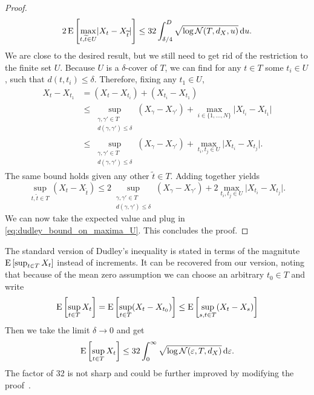 \begin{proof}
\begin{equation}\label{eq:dudley_bound_on_maxima_U}
    2 \E\left[\max_{t,\widetilde{t} \in U} \lvert X_{t} - X_{\widetilde{t}} \rvert\right] \leq 32 \int_{\delta/4}^{D}  \sqrt{\log \mathcal{N}(T,d_{X},u)} \dx[u].
\end{equation}
We are close to the desired result, but we still need to get rid of the restriction to the finite set $U$.
Because $U$ is a $\delta$-cover of $T$, we can find for any \( t \in T \) some $t_{i} \in U$, such that \( d(t,t_{i})  \leq \delta \). Therefore, fixing any $t_{1} \in U$,
\begin{align*}
    X_{t}-X_{t_{1}} &= (X_{t}-X_{t_{i}}) + (X_{t_{i}}-X_{t_{1}})\\
    &\leq \sup_{\substack{\gamma,\gamma' \in T \\ d(\gamma,\gamma')\leq \delta}} (X_{\gamma}-X_{\gamma'}) + \max_{i \in \{1, \dots, N\}} \lvert X_{t_{i}}-X_{t_{1}} \rvert\\
    &\leq \sup_{\substack{\gamma,\gamma' \in T \\ d(\gamma,\gamma')\leq \delta}} (X_{\gamma}-X_{\gamma'}) + \max_{t_{i}, t_{j} \in U} \lvert X_{t_{i}}-X_{t_{j}}\rvert.
\end{align*}
The same bound holds given any other $\tilde{t} \in T$. Adding together yields
\[
    \sup_{t, \tilde{t} \in T }(X_{t}-X_{\tilde{t}}) \leq 2 \sup_{\substack{\gamma,\gamma' \in T \\ d(\gamma,\gamma')\leq \delta}} (X_{\gamma}-X_{\gamma'}) + 2 \max_{t_{i}, t_{j} \in U} \lvert X_{t_{i}}-X_{t_{j}}\rvert.
\]
We can now take the expected value and plug in \eqref{eq:dudley_bound_on_maxima_U}. This concludes the proof.
\end{proof}

\begin{remark}
    The standard version of Dudley's inequality is stated in terms of the magnitute \( \E\left[\sup_{t \in T} X_{t}\right] \) instead of increments.
    It can be recovered from our version, noting that because of the mean zero assumption we can choose an arbitrary \( t_{0} \in T \) and write
    \[
        \E\left[\sup_{t \in T} X_{t}\right] = \E\left[ \sup_{t \in T}(X_{t}-X_{t_{0}})\right] \leq \E\left[\sup_{s,t \in T} (X_{t} - X_{s})\right] 
    \]
    Then we take the limit \( \delta \to 0 \) and get
    \[
        \E\left[\sup_{t \in T} X_{t}\right] \leq 32 \int_{0}^{\infty} \sqrt{\log \mathcal{N}(\varepsilon,T,d_{X})}\dx[\varepsilon].
    \] 
    The factor of 32 is not sharp and could be further improved by modifying the proof~\cite[p. 140]{wainwright2019high}.
    
\end{remark}








